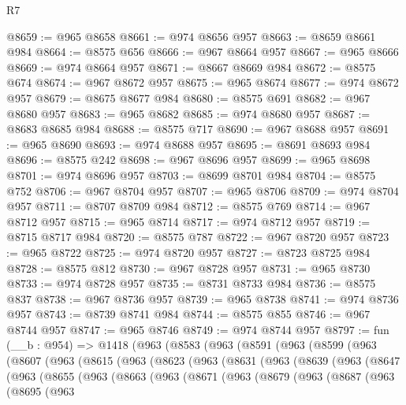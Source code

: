 \begin{lexlean}{R7}
\begin{coremodule}
@8659 := @965 @8658
@8661 := @974 @8656 @957
@8663 := @8659 @8661 @984
@8664 := @8575 @656
@8666 := @967 @8664 @957
@8667 := @965 @8666
@8669 := @974 @8664 @957
@8671 := @8667 @8669 @984
@8672 := @8575 @674
@8674 := @967 @8672 @957
@8675 := @965 @8674
@8677 := @974 @8672 @957
@8679 := @8675 @8677 @984
@8680 := @8575 @691
@8682 := @967 @8680 @957
@8683 := @965 @8682
@8685 := @974 @8680 @957
@8687 := @8683 @8685 @984
@8688 := @8575 @717
@8690 := @967 @8688 @957
@8691 := @965 @8690
@8693 := @974 @8688 @957
@8695 := @8691 @8693 @984
@8696 := @8575 @242
@8698 := @967 @8696 @957
@8699 := @965 @8698
@8701 := @974 @8696 @957
@8703 := @8699 @8701 @984
@8704 := @8575 @752
@8706 := @967 @8704 @957
@8707 := @965 @8706
@8709 := @974 @8704 @957
@8711 := @8707 @8709 @984
@8712 := @8575 @769
@8714 := @967 @8712 @957
@8715 := @965 @8714
@8717 := @974 @8712 @957
@8719 := @8715 @8717 @984
@8720 := @8575 @787
@8722 := @967 @8720 @957
@8723 := @965 @8722
@8725 := @974 @8720 @957
@8727 := @8723 @8725 @984
@8728 := @8575 @812
@8730 := @967 @8728 @957
@8731 := @965 @8730
@8733 := @974 @8728 @957
@8735 := @8731 @8733 @984
@8736 := @8575 @837
@8738 := @967 @8736 @957
@8739 := @965 @8738
@8741 := @974 @8736 @957
@8743 := @8739 @8741 @984
@8744 := @8575 @855
@8746 := @967 @8744 @957
@8747 := @965 @8746
@8749 := @974 @8744 @957
@8797 := fun (__b : @954) =>
  @1418
    (@963
      (@8583
        (@963
          (@8591
            (@963
              (@8599
                (@963
                  (@8607
                    (@963
                      (@8615
                        (@963
                          (@8623
                            (@963
                              (@8631
                                (@963
                                  (@8639
                                    (@963
                                      (@8647
                                        (@963
                                          (@8655
                                            (@963
                                              (@8663
                                                (@963
                                                  (@8671
                                                    (@963
                                                      (@8679
                                                        (@963
                                                          (@8687
                                                            (@963
                                                              (@8695
                                                                (@963

\end{coremodule}
\end{lexlean}
